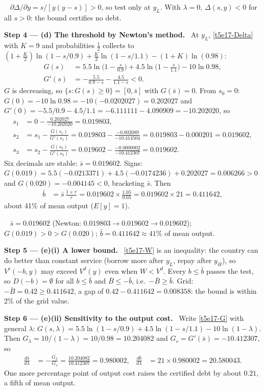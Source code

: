 \documentclass[11pt,a4paper]{article}
\newcommand{\step}[2]{\par\medskip\noindent\textbf{Step #1 --- #2.}~}
\newcommand{\answer}[1]{\par\smallskip\noindent\fbox{\textbf{Answer #1.}}~}
\begin{document}
\answer{(c)} $\partial\Delta/\partial y=s/[y(y-s)]>0$, so test only at $y_L$. With $\lambda=0$, $\Delta(s,y)<0$ for all $s>0$: the bound certifies no debt.

\step{4}{(d) The threshold by Newton's method} At $y_L$, \eqref{t5e17-Delta} with $K=9$ and probabilities $\tfrac12$ collects to $(1+\tfrac K2)\ln(1-s/0.9)+\tfrac K2\ln(1-s/1.1)-(1+K)\ln(0.98)$:
\begin{align}
  G(s) &= 5.5\ln\!\Big(1-\frac{s}{0.9}\Big)+4.5\ln\!\Big(1-\frac{s}{1.1}\Big)-10\ln0.98, \label{t5e17-G}\\
  G'(s) &= -\frac{5.5}{0.9-s}-\frac{4.5}{1.1-s} < 0. \nonumber
\end{align}
$G$ is decreasing, so $\{s:G(s)\ge0\}=[0,\bar s]$ with $G(\bar s)=0$. From $s_0=0$: $G(0)=-10\ln0.98=-10(-0.0202027)=0.202027$ and
$G'(0)=-5.5/0.9-4.5/1.1=-6.111111-4.090909=-10.202020$, so
\begin{align}
  s_1 &= 0-\frac{0.202027}{-10.202020} = 0.019803, \nonumber\\
  s_2 &= s_1-\frac{G(s_1)}{G'(s_1)} = 0.019803-\frac{-0.002089}{-10.414504} = 0.019803-0.000201 = 0.019602, \nonumber\\
  s_3 &= s_2-\frac{G(s_2)}{G'(s_2)} = 0.019602-\frac{-0.0000002}{-10.412307} = 0.019602. \nonumber
\end{align}
Six decimals are stable: $\bar s=0.019602$. Signs: $G(0.019)=5.5(-0.0213371)+4.5(-0.0174236)+0.202027=0.006266>0$ and $G(0.020)=-0.004145<0$, bracketing $\bar s$. Then
\begin{align}
  \bar b &= \bar s\,\frac{1+r}{r} = 0.019602\times\frac{1.05}{0.05} = 0.019602\times21 = 0.411642, \nonumber
\end{align}
about 41\% of mean output ($E[y]=1$).

\answer{(d)} $\bar s=0.019602$ (Newton: $0.019803\to0.019602\to0.019602$); $G(0.019)>0>G(0.020)$; $\bar b=0.411642\approx41\%$ of mean output.

\step{5}{(e)(i) A lower bound} \eqref{t5e17-W} is an inequality: the country can do better than constant service (borrow more after $y_L$, repay after $y_H$), so
$V^c(-b,y)$ may exceed $V^d(y)$ even when $W<V^d$. Every $b\le\bar b$ passes the test, so $D(-b)=\emptyset$ for all $b\le\bar b$ and $\bar B\le-\bar b$, i.e.\ $-\bar B\ge\bar b$.
Grid: $-\bar B=0.42\ge0.411642$, a gap of $0.42-0.411642=0.008358$: the bound is within 2\% of the grid value.

\step{6}{(e)(ii) Sensitivity to the output cost} Write \eqref{t5e17-G} with general $\lambda$: $G(s,\lambda)=5.5\ln(1-s/0.9)+4.5\ln(1-s/1.1)-10\ln(1-\lambda)$. Then
$G_\lambda=10/(1-\lambda)=10/0.98=10.204082$ and $G_s=G'(\bar s)=-10.412307$, so
\begin{align}
  \frac{d\bar s}{d\lambda} &= -\frac{G_\lambda}{G_s} = \frac{10.204082}{10.412307} = 0.980002, &
  \frac{d\bar b}{d\lambda} &= 21\times0.980002 = 20.580043. \nonumber
\end{align}
One more percentage point of output cost raises the certified debt by about $0.21$, a fifth of mean output.
\end{document}
